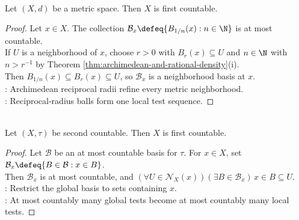 \begin{proposition} \label{prop:metric-spaces-first-countable} \\
Let $(X,d)$ be a metric space. Then $X$ is first countable.
\begin{proof}
Let $x\in X$. The collection $\mathcal{B}_x\defeq\{B_{1/n}(x):n\in\N\}$ is at most countable.\\
If $U$ is a neighborhood of $x$, choose $r>0$ with $B_r(x)\subseteq U$ and $n\in\N$ with $n>r^{-1}$ by Theorem \ref{thm:archimedean-and-rational-density}(i).\\
Then $B_{1/n}(x)\subseteq B_r(x)\subseteq U$, so $\mathcal{B}_x$ is a neighborhood basis at $x$.\\
: Archimedean reciprocal radii refine every metric neighborhood.\\
: Reciprocal-radius balls form one local test sequence.
\end{proof}
\end{proposition}

\begin{proposition} \label{prop:second-countable-implies-first-countable} \\
Let $(X,\tau)$ be second countable. Then $X$ is first countable.
\begin{proof} Let $\mathcal{B}$ be an at most countable basis for $\tau$. For $x\in X$, set $\mathcal{B}_x\defeq\{B\in\mathcal{B}:x\in B\}$.\\
Then $\mathcal{B}_x$ is at most countable, and $(\forall U\in\mathcal{N}_X(x))(\exists B\in\mathcal{B}_x)\,x\in B\subseteq U$.\\
: Restrict the global basis to sets containing $x$.\\
: At most countably many global tests become at most countably many local tests.
\end{proof}
\end{proposition}

